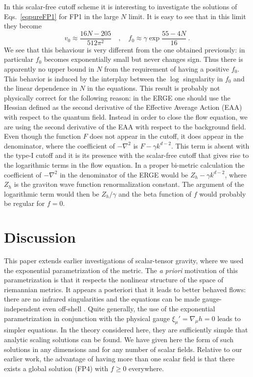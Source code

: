 \documentclass[11pt,draft]{book} %
\newcommand{\be}{\begin{equation}}
\newcommand{\ee}{\end{equation}}
\begin{document}
In this scalar-free cutoff scheme it is interesting to investigate the solutions of
Eqs.~\eqref{eqpureFP1} for FP1 in the large $N$ limit.
It is easy to see that in this limit they become
\be
v_0\approx \frac{16N-205}{512\pi^2} \quad , \quad
f_0\approx \gamma\exp{\frac{55-4N}{16}}\ .
\ee
We see that this behaviour is very different from the one obtained previously:
in particular $f_0$ becomes exponentially small but never changes sign.
Thus there is apparently no upper bound in $N$ from the requirement of having a positive $f_0$.
This behavior is induced by the interplay between the $\log$ singularity
in $f_0$ and the linear dependence in $N$ in the equations.
This result is probably not physically correct for the following
reason: in the ERGE one should use the Hessian defined as the second
derivative of the Effective Average Action (EAA) with respect to the quantum field.
Instead in order to close the flow equation,
we are using the second derivative of the
EAA with respect to the background field.
Even though the function $F$ does not appear in the cutoff,
it does appear in the denominator, where the coefficient
of $-\nabla^2$ is $F-\gamma k^{d-2}$.
This term is absent with the type-I cutoff and
it is its presence with the scalar-free cutoff that gives rise
to the logarithmic terms in the flow equation.
In a proper bi-metric calculation the coefficient of
$-\nabla^2$ in the denominator of the ERGE
would be $Z_h-\gamma k^{d-2}$, where $Z_h$ is the graviton
wave function renormalization constant.
The argument of the logarithmic term would then be $Z_h/\gamma$
and the beta function of $f$ would probably be regular for $f=0$.

\section{Discussion}

This paper extends earlier investigations of scalar-tensor
gravity, where we used the exponential parametrization of the metric.
The {\it a priori} motivation of this parametrization is that
it respects the nonlinear structure of the space of riemannian metrics.
It appears a posteriori that it leads to better behaved flows:
there are no infrared singularities \cite{Percacci:2015wwa,Falls:2015qga}
and the equations can be made gauge-independent even off-shell
\cite{Falls:2015qga}.
Quite generally, the use of the exponential parametrization
in conjunction with the physical gauge $\xi_\mu'=\nabla_\mu h=0$
leads to simpler equations.
In the theory considered here, they are sufficiently simple
that analytic scaling solutions can be found.
We have given here the form of such solutions in any dimensions
and for any number of scalar fields.
Relative to our earlier work, the advantage of having more than
one scalar field is that there exists a global solution (FP4)
with $f\geq 0$ everywhere.
\end{document}
